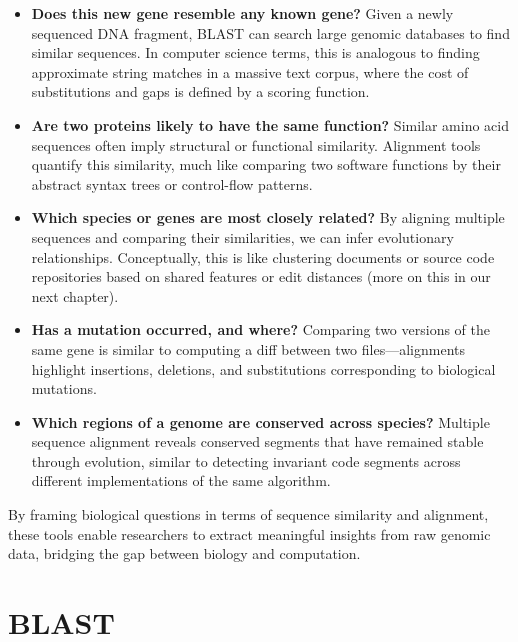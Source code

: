\begin{itemize}
    \item \textbf{Does this new gene resemble any known gene?}  
    Given a newly sequenced DNA fragment, BLAST can search large genomic databases to find similar sequences. In computer science terms, this is analogous to finding approximate string matches in a massive text corpus, where the cost of substitutions and gaps is defined by a scoring function.

    \item \textbf{Are two proteins likely to have the same function?}  
    Similar amino acid sequences often imply structural or functional similarity. Alignment tools quantify this similarity, much like comparing two software functions by their abstract syntax trees or control-flow patterns.

    \item \textbf{Which species or genes are most closely related?}  
    By aligning multiple sequences and comparing their similarities, we can infer evolutionary relationships. Conceptually, this is like clustering documents or source code repositories based on shared features or edit distances (more on this in our next chapter).

    \item \textbf{Has a mutation occurred, and where?}  
    Comparing two versions of the same gene is similar to computing a diff between two files—alignments highlight insertions, deletions, and substitutions corresponding to biological mutations.

    \item \textbf{Which regions of a genome are conserved across species?}  
    Multiple sequence alignment reveals conserved segments that have remained stable through evolution, similar to detecting invariant code segments across different implementations of the same algorithm.
\end{itemize}

By framing biological questions in terms of sequence similarity and alignment, these tools enable researchers to extract meaningful insights from raw genomic data, bridging the gap between biology and computation.

\section{BLAST}


